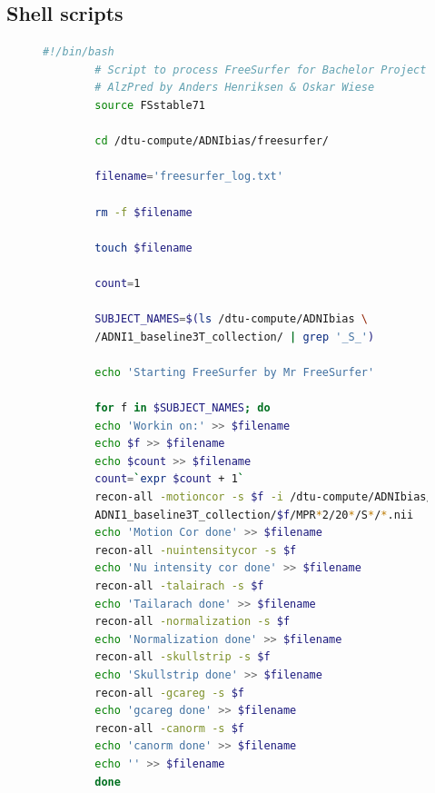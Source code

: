 \documentclass[11pt, fleqn, titlepage]{article}
\newcommand{\1}[1]{\mathds{1}\left[#1\right]}
\newcommand\pythonstyle{\lstset{
		language=Python,
		tabsize=2,
		basicstyle=\ttm,
		morekeywords={self},              %
		keywordstyle=\ttb\color{deepblue},
		emph={MyClass,__init__},          %
		emphstyle=\ttb\color{deepred},    %
		stringstyle=\color{deepgreen},
		frame=tb,                         %
		showstringspaces=false,
		literate={\ \ }{{\ }}1
}}
\newcommand\pythonexternal[2][]{{
\pythonstyle
}}
\begin{document}
%
%
%
%

\subsection{Shell scripts}
\begin{figure}[H]
	\scriptsize
	\begin{lstlisting}[language=bash,caption={FreeSurfer Preprocessing}]
		#!/bin/bash 
		# Script to process FreeSurfer for Bachelor Project:
		# AlzPred by Anders Henriksen & Oskar Wiese
		source FSstable71
		
		cd /dtu-compute/ADNIbias/freesurfer/
		
		filename='freesurfer_log.txt'
		
		rm -f $filename
		
		touch $filename
		
		count=1
		
		SUBJECT_NAMES=$(ls /dtu-compute/ADNIbias \ 
		/ADNI1_baseline3T_collection/ | grep '_S_')
		
		echo 'Starting FreeSurfer by Mr FreeSurfer' 
		
		for f in $SUBJECT_NAMES; do
		echo 'Workin on:' >> $filename
		echo $f >> $filename
		echo $count >> $filename 
		count=`expr $count + 1`
		recon-all -motioncor -s $f -i /dtu-compute/ADNIbias/ \
		ADNI1_baseline3T_collection/$f/MPR*2/20*/S*/*.nii 
		echo 'Motion Cor done' >> $filename
		recon-all -nuintensitycor -s $f  
		echo 'Nu intensity cor done' >> $filename
		recon-all -talairach -s $f 
		echo 'Tailarach done' >> $filename
		recon-all -normalization -s $f 
		echo 'Normalization done' >> $filename
		recon-all -skullstrip -s $f     
		echo 'Skullstrip done' >> $filename
		recon-all -gcareg -s $f  
		echo 'gcareg done' >> $filename
		recon-all -canorm -s $f  
		echo 'canorm done' >> $filename
		echo '' >> $filename
		done 
		
	\end{lstlisting}
	\caption{}
	\label{script1}
\end{figure}
\end{document}
